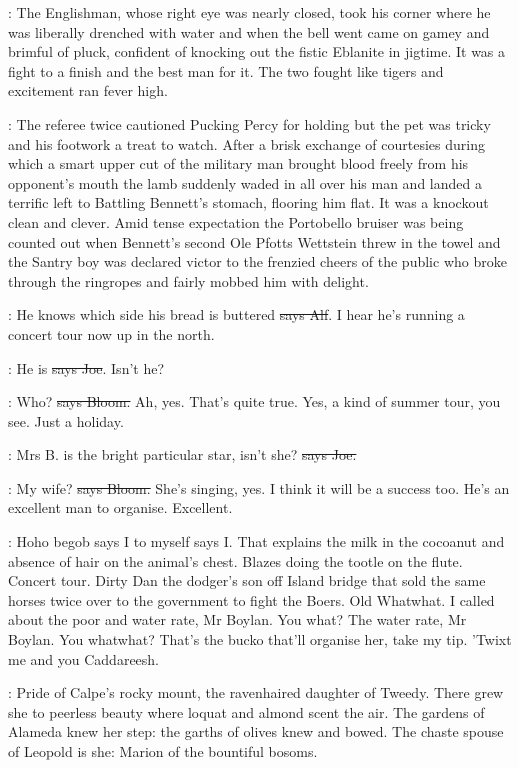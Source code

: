 :
The Englishman, whose right eye was nearly closed, took
his corner where he was liberally drenched with water and when the bell
went came on gamey and brimful of pluck, confident of knocking out the
fistic Eblanite in jigtime. It was a fight to a finish and the best man
for it. The two fought like tigers and excitement ran fever high.

:
The referee twice cautioned Pucking Percy for holding but the pet was tricky
and his footwork a treat to watch. After a brisk exchange of courtesies
during which a smart upper cut of the military man brought blood freely
from his opponent's mouth the lamb suddenly waded in all over his man and
landed a terrific left to Battling Bennett's stomach, flooring him flat.
It was a knockout clean and clever. Amid tense expectation the Portobello
bruiser was being counted out when Bennett's second Ole Pfotts Wettstein
threw in the towel and the Santry boy was declared victor to the frenzied
cheers of the public who broke through the ringropes and fairly mobbed him
with delight.

\bergan:
He knows which side his bread is buttered \sout{says Alf}.
I hear he's running
a concert tour now up in the north.

\joe:
He is \sout{says Joe}. Isn't he?

\Bloom:
Who? \sout{says Bloom.}
Ah, yes. That's quite true. Yes, a kind of summer tour,
you see. Just a holiday.

\joe:
Mrs B. is the bright particular star,
isn't she? \sout{says Joe.}

\Bloom:
My wife? \sout{says Bloom.} She's singing, yes.
I think it will be a success too.
He's an excellent man to organise. Excellent.

\Nq:
Hoho begob says I to myself says I. That explains the milk in the cocoanut
and absence of hair on the animal's chest. Blazes doing the tootle on the
flute. Concert tour. Dirty Dan the dodger's son off Island bridge that
sold the same horses twice over to the government to fight the Boers. Old
Whatwhat. I called about the poor and water rate, Mr Boylan. You what?
The water rate, Mr Boylan. You whatwhat? That's the bucko that'll
organise her, take my tip. 'Twixt me and you Caddareesh.

:
Pride of Calpe's rocky mount, the ravenhaired daughter of Tweedy.
There grew she to peerless beauty where loquat and almond scent the air.
The gardens of Alameda knew her step: the garths of olives knew and
bowed. The chaste spouse of Leopold is she: Marion of the bountiful
bosoms.

